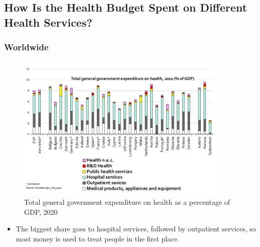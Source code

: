     \subsection{How Is the Health Budget Spent on Different Health Services?}

        
        \subsubsection{Worldwide}
        
            \begin{figure}[H]%
                \centering
                \includegraphics[width=4in]{images/ch3/10.png}
                \caption{Total general government expenditure on health as a percentage of GDP, 2020}
            \end{figure} 
        \begin{itemize}           
            \item The biggest share goes to hospital services, followed by outpatient services, so most money is used to treat people in the first place.
        \end{itemize}

